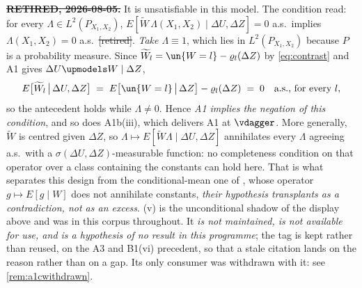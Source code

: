 %
%

\begin{assumption}\label{ass:instrcomp}
\textbf{\sout{RETIRED, 2026-08-05.}} It is unsatisfiable in this model. The condition read:
for every $\Lambda\in L^{2}(P_{X_1,X_2})$,
$E[\widetilde W\,\Lambda(X_1,X_2)\mid\Delta U,\Delta Z]=0$ a.s.\ implies
$\Lambda(X_1,X_2)=0$ a.s.\ \sout{[retired]}. \emph{Take $\Lambda\equiv1$}, which lies in
$L^{2}(P_{X_1,X_2})$ because $P$ is a probability measure. Since
$\widetilde W_l=\un\{W=l\}-\varrho_l(\Delta Z)$ by \eqref{eq:contrast} and A1 gives
$\Delta U\upmodels W\mid\Delta Z$,
\[
E\big[\widetilde W_l\,\big|\,\Delta U,\Delta Z\big]\;=\;E\big[\un\{W=l\}\,\big|\,\Delta Z\big]-\varrho_l(\Delta Z)\;=\;0
\quad\text{a.s., for every }l ,
\]
so the antecedent holds while $\Lambda\ne0$. Hence \emph{A1 implies the negation of this condition},
and so does A1b(iii), which delivers A1 at $\vdagger$. More generally, $\widetilde W$ is centred
given $\Delta Z$, so $\Lambda\mapsto E[\widetilde W\Lambda\mid\Delta U,\Delta Z]$ annihilates every
$\Lambda$ agreeing a.s.\ with a $\sigma(\Delta U,\Delta Z)$-measurable function: no completeness
condition on that operator over a class containing the constants can hold here. That is what separates
this design from the conditional-mean one of \citet{feve2014}, whose operator $g\mapsto E[g\mid W]$ does
not annihilate constants, \emph{their hypothesis transplants as a contradiction, not as an excess}.
\textup{(v)} is the unconditional shadow of the display above and was in this
corpus throughout. It \emph{is not maintained, is not available for use, and is a hypothesis of no result in
this programme}; the tag is kept rather than reused, on the A3 and B1(vi) precedent, so that a stale
citation lands on the reason rather than on a gap. Its only consumer was withdrawn with it: see
\cref{rem:a1cwithdrawn}.
\end{assumption}


